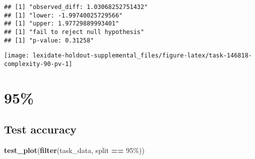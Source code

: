 \documentclass[
]{book}
\newenvironment{Shaded}{\begin{snugshade}}{\end{snugshade}}
\newcommand{\AttributeTok}[1]{\textcolor[rgb]{0.13,0.29,0.53}{#1}}
\newcommand{\DecValTok}[1]{\textcolor[rgb]{0.00,0.00,0.81}{#1}}
\newcommand{\FunctionTok}[1]{\textcolor[rgb]{0.13,0.29,0.53}{\textbf{#1}}}
\newcommand{\NormalTok}[1]{#1}
\newcommand{\OtherTok}[1]{\textcolor[rgb]{0.56,0.35,0.01}{#1}}
\newcommand{\SpecialCharTok}[1]{\textcolor[rgb]{0.81,0.36,0.00}{\textbf{#1}}}
\newcommand{\StringTok}[1]{\textcolor[rgb]{0.31,0.60,0.02}{#1}}
\begin{document}
\begin{Shaded}
\end{Shaded}

\begin{verbatim}
## [1] "observed_diff: 1.03068252751432"
## [1] "lower: -1.99740025729566"
## [1] "upper: 1.97729889993401"
## [1] "fail to reject null hypothesis"
## [1] "p-value: 0.31258"
\end{verbatim}

\texttt{[image: lexidate-holdout-supplemental\_files/figure-latex/task-146818-complexity-90-pv-1]}

\hypertarget{section-4}{%
\section{95\%}\label{section-4}}

\hypertarget{test-accuracy-4}{%
\subsection{Test accuracy}\label{test-accuracy-4}}

\begin{Shaded}
\begin{Highlighting}[]
\FunctionTok{test\_plot}\NormalTok{(}\FunctionTok{filter}\NormalTok{(task\_data, split }\SpecialCharTok{==} \StringTok{\textquotesingle{}95\%\textquotesingle{}}\NormalTok{))}
\end{Highlighting}
\end{Shaded}
\end{document}
